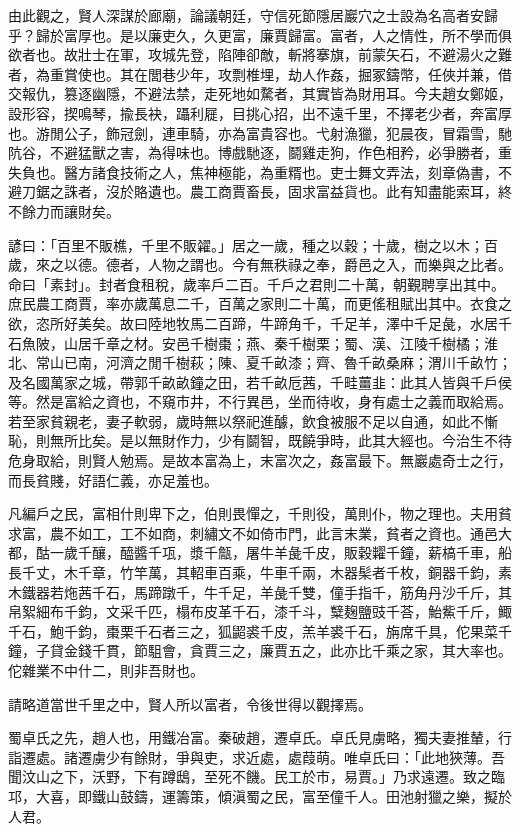 \begin{pinyinscope}
由此觀之，賢人深謀於廊廟，論議朝廷，守信死節隱居巖穴之士設為名高者安歸乎？歸於富厚也。是以廉吏久，久更富，廉賈歸富。富者，人之情性，所不學而俱欲者也。故壯士在軍，攻城先登，陷陣卻敵，斬將搴旗，前蒙矢石，不避湯火之難者，為重賞使也。其在閭巷少年，攻剽椎埋，劫人作姦，掘冢鑄幣，任俠并兼，借交報仇，篡逐幽隱，不避法禁，走死地如騖者，其實皆為財用耳。今夫趙女鄭姬，設形容，揳鳴琴，揄長袂，躡利屣，目挑心招，出不遠千里，不擇老少者，奔富厚也。游閒公子，飾冠劍，連車騎，亦為富貴容也。弋射漁獵，犯晨夜，冒霜雪，馳阬谷，不避猛獸之害，為得味也。博戲馳逐，鬬雞走狗，作色相矜，必爭勝者，重失負也。醫方諸食技術之人，焦神極能，為重糈也。吏士舞文弄法，刻章偽書，不避刀鋸之誅者，沒於賂遺也。農工商賈畜長，固求富益貨也。此有知盡能索耳，終不餘力而讓財矣。

諺曰：「百里不販樵，千里不販糴。」居之一歲，種之以穀；十歲，樹之以木；百歲，來之以德。德者，人物之謂也。今有無秩祿之奉，爵邑之入，而樂與之比者。命曰「素封」。封者食租稅，歲率戶二百。千戶之君則二十萬，朝覲聘享出其中。庶民農工商賈，率亦歲萬息二千，百萬之家則二十萬，而更傜租賦出其中。衣食之欲，恣所好美矣。故曰陸地牧馬二百蹄，牛蹄角千，千足羊，澤中千足彘，水居千石魚陂，山居千章之材。安邑千樹棗；燕、秦千樹栗；蜀、漢、江陵千樹橘；淮北、常山已南，河濟之閒千樹萩；陳、夏千畝漆；齊、魯千畝桑麻；渭川千畝竹；及名國萬家之城，帶郭千畝畝鐘之田，若千畝卮茜，千畦薑韭：此其人皆與千戶侯等。然是富給之資也，不窺市井，不行異邑，坐而待收，身有處士之義而取給焉。若至家貧親老，妻子軟弱，歲時無以祭祀進醵，飲食被服不足以自通，如此不慚恥，則無所比矣。是以無財作力，少有鬬智，既饒爭時，此其大經也。今治生不待危身取給，則賢人勉焉。是故本富為上，末富次之，姦富最下。無巖處奇士之行，而長貧賤，好語仁義，亦足羞也。

凡編戶之民，富相什則卑下之，伯則畏憚之，千則役，萬則仆，物之理也。夫用貧求富，農不如工，工不如商，刺繡文不如倚市門，此言末業，貧者之資也。通邑大都，酤一歲千釀，醯醬千瓨，漿千甔，屠牛羊彘千皮，販穀糶千鐘，薪槁千車，船長千丈，木千章，竹竿萬，其軺車百乘，牛車千兩，木器髤者千枚，銅器千鈞，素木鐵器若炧茜千石，馬蹄蹾千，牛千足，羊彘千雙，僮手指千，筋角丹沙千斤，其帛絮細布千鈞，文采千匹，榻布皮革千石，漆千斗，糱麹鹽豉千荅，鮐鮆千斤，鯫千石，鮑千鈞，棗栗千石者三之，狐鼦裘千皮，羔羊裘千石，旃席千具，佗果菜千鐘，子貸金錢千貫，節駔會，貪賈三之，廉賈五之，此亦比千乘之家，其大率也。佗雜業不中什二，則非吾財也。

請略道當世千里之中，賢人所以富者，令後世得以觀擇焉。

蜀卓氏之先，趙人也，用鐵冶富。秦破趙，遷卓氏。卓氏見虜略，獨夫妻推輦，行詣遷處。諸遷虜少有餘財，爭與吏，求近處，處葭萌。唯卓氏曰：「此地狹薄。吾聞汶山之下，沃野，下有蹲鴟，至死不饑。民工於市，易賈。」乃求遠遷。致之臨邛，大喜，即鐵山鼓鑄，運籌策，傾滇蜀之民，富至僮千人。田池射獵之樂，擬於人君。


\end{pinyinscope}
